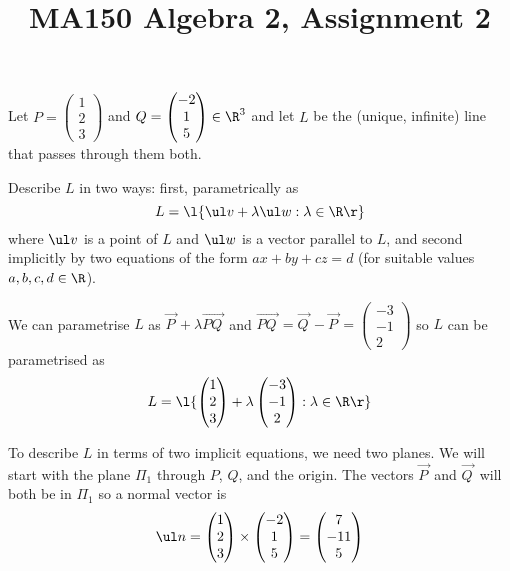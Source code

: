 \documentclass[a4paper]{article}
\title{MA150 Algebra 2, Assignment 2}
\begin{document}
\maketitle

\setlength{\parindent}{0em}
\setlength{\parskip}{1em}


\begin{questionbody}
Let $P = \begin{pmatrix}1\\ 2\\ 3\end{pmatrix}$ and $Q = \begin{pmatrix}-2\\ 1\\ 5\end{pmatrix} \in \R^3$ and let $L$ be the (unique, infinite) line that passes through them both.

Describe $L$ in two ways: first, parametrically as $$L = \l\{ \ul v + \lambda \ul w : \lambda \in \R \r\}$$
where $\ul v$ is a point of $L$ and $\ul w$ is a vector parallel to $L$, and second implicitly by two equations of the form $ax + by + cz = d$ (for suitable values $a, b, c, d \in \R$).
\end{questionbody}

We can parametrise $L$ as $\overrightarrow{P\,} + \lambda \overrightarrow{PQ\,}$ and $\overrightarrow{PQ\,} = \overrightarrow{Q\,} - \overrightarrow{P\,} = \begin{pmatrix}-3\\ -1\\ 2\end{pmatrix}$ so $L$ can be parametrised as $$L = \l\{ \begin{pmatrix}1\\ 2\\ 3\end{pmatrix} + \lambda \begin{pmatrix}-3\\ -1\\ 2\end{pmatrix} : \lambda \in \R \r\}$$

To describe $L$ in terms of two implicit equations, we need two planes. We will start with the plane $\Pi_1$ through $P$, $Q$, and the origin. The vectors $\overrightarrow{P\,}$ and $\overrightarrow{Q\,}$ will both be in $\Pi_1$ so a normal vector is $$\ul n = \begin{pmatrix}1\\ 2\\ 3\end{pmatrix} \times \begin{pmatrix}-2\\ 1\\ 5\end{pmatrix} = \begin{pmatrix}7\\ -11\\ 5\end{pmatrix}$$
\end{document}

